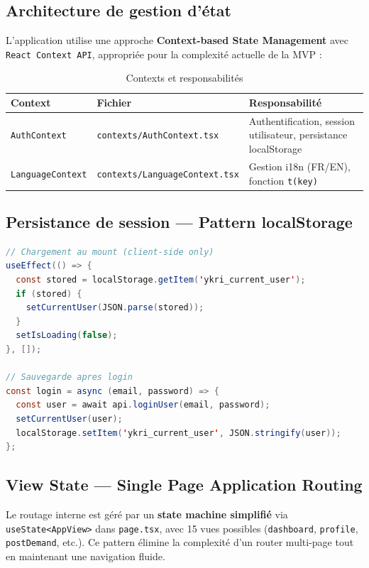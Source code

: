 \documentclass[12pt, a4paper]{article}
\begin{document}
\subsection{Architecture de gestion d'état}

L'application utilise une approche \textbf{Context-based State Management} avec \texttt{React Context API}, appropriée pour la complexité actuelle de la MVP :

\begin{table}[h!]
\centering
\caption{Contexts et responsabilités}
\begin{tabularx}{\textwidth}{l l X}
\toprule
\textbf{Context} & \textbf{Fichier} & \textbf{Responsabilité} \\
\midrule
\texttt{AuthContext}     & \texttt{contexts/AuthContext.tsx}     & Authentification, session utilisateur, persistance localStorage \\
\texttt{LanguageContext} & \texttt{contexts/LanguageContext.tsx}  & Gestion i18n (FR/EN), fonction \texttt{t(key)} \\
\bottomrule
\end{tabularx}
\end{table}

\subsection{Persistance de session — Pattern localStorage}

\begin{lstlisting}[language=Java, caption=Persistance dans AuthContext.tsx]
// Chargement au mount (client-side only)
useEffect(() => {
  const stored = localStorage.getItem('ykri_current_user');
  if (stored) {
    setCurrentUser(JSON.parse(stored));
  }
  setIsLoading(false);
}, []);

// Sauvegarde apres login
const login = async (email, password) => {
  const user = await api.loginUser(email, password);
  setCurrentUser(user);
  localStorage.setItem('ykri_current_user', JSON.stringify(user));
};
\end{lstlisting}

\subsection{View State — Single Page Application Routing}

Le routage interne est géré par un \textbf{state machine simplifié} via \texttt{useState<AppView>} dans \texttt{page.tsx}, avec 15 vues possibles (\texttt{dashboard}, \texttt{profile}, \texttt{postDemand}, etc.). Ce pattern élimine la complexité d'un router multi-page tout en maintenant une navigation fluide.
\end{document}
